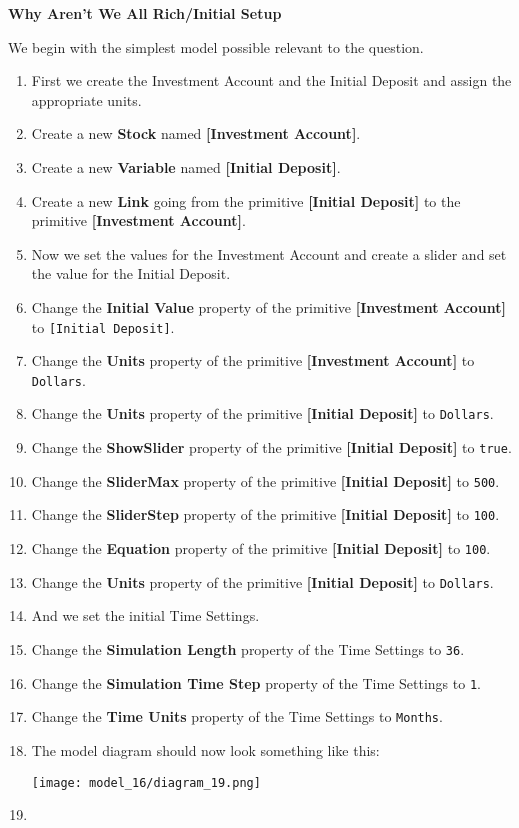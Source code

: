 \documentclass[]{memoir}
\makeatletter
\def\maxwidth{\ifdim\Gin@nat@width>\linewidth\linewidth
\else\Gin@nat@width\fi}
\let\Oldincludegraphics\includegraphics
\renewcommand{\includegraphics}[1]{\Oldincludegraphics[width=\maxwidth]{#1}}
\newcommand{\p}[1]{\textbf{{[}#1{]}}}
\newcommand{\e}[1]{\texttt{#1}}
\renewcommand{\a}[1]{\textbf{#1}}
\makeatother
\begin{document}
\begin{oframed}\textbf{Why Aren't We All Rich/Initial Setup} 

 We begin with the simplest model possible relevant to the question.

\begin{enumerate}
\item 

First we create the Investment Account and the Initial Deposit and assign the appropriate units.


\item Create a new \a{Stock} named \p{Investment Account}.
\item Create a new \a{Variable} named \p{Initial Deposit}.
\item Create a new \a{Link} going from the primitive \p{Initial Deposit} to the primitive \p{Investment Account}.
\item 

Now we set the values for the Investment Account and create a slider and set the value for the Initial Deposit.


\item  Change the \a{Initial Value} property of the primitive \p{Investment Account} to \e{[Initial Deposit]}.
\item  Change the \a{Units} property of the primitive \p{Investment Account} to \e{Dollars}.
\item  Change the \a{Units} property of the primitive \p{Initial Deposit} to \e{Dollars}.
\item  Change the \a{ShowSlider} property of the primitive \p{Initial Deposit} to \e{true}.
\item  Change the \a{SliderMax} property of the primitive \p{Initial Deposit} to \e{500}.
\item  Change the \a{SliderStep} property of the primitive \p{Initial Deposit} to \e{100}.
\item  Change the \a{Equation} property of the primitive \p{Initial Deposit} to \e{100}.
\item  Change the \a{Units} property of the primitive \p{Initial Deposit} to \e{Dollars}.
\item 

And we set the initial Time Settings.


\item  Change the \a{Simulation Length} property of the Time Settings to \e{36}.
\item  Change the \a{Simulation Time Step} property of the Time Settings to \e{1}.
\item  Change the \a{Time Units} property of the Time Settings to \e{Months}.
\item The model diagram should now look something like this: \par \begin{minipage}{\linewidth}  \centering \texttt{[image: model\_16/diagram\_19.png]}
\end{minipage}
\item 


\end{enumerate}
\end{oframed}
\end{document}
